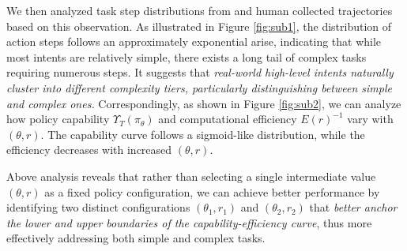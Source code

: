 \documentclass{article}
\begin{document}
We then analyzed task step distributions from \citet{deng2023mind2web} and \citet{zhou2023webarena} human collected trajectories based on this observation. As illustrated in Figure \ref{fig:sub1}, the distribution of action steps follows an approximately exponential arise, indicating that while most intents are relatively simple, there exists a long tail of complex tasks requiring numerous steps. It suggests that \textit{real-world high-level intents naturally cluster into different complexity tiers, particularly distinguishing between simple and complex ones.} Correspondingly, as shown in Figure \ref{fig:sub2}, we can analyze how policy capability $\Upsilon_T(\pi_\theta)$ and computational efficiency $E(r)^{-1}$ vary with $(\theta,r)$. The capability curve follows a sigmoid-like distribution, while the efficiency decreases with increased $(\theta,r)$.

Above analysis reveals that rather than selecting a single intermediate value $(\theta, r)$ as a fixed policy configuration, we can achieve better performance by identifying two distinct configurations $(\theta_1, r_1)$ and $(\theta_2, r_2)$ that \textit{better anchor the lower and upper boundaries of the capability-efficiency curve}, thus more effectively addressing both simple and complex tasks.
\end{document}

